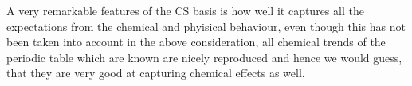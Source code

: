 A very remarkable features of the CS basis is how well it captures all the expectations
from the chemical and phyisical behaviour, even though this has not been taken
into account in the above consideration, all chemical trends of the
periodic table which are known are nicely reproduced and hence
we would guess, that they are very good at capturing chemical effects as well.




%
